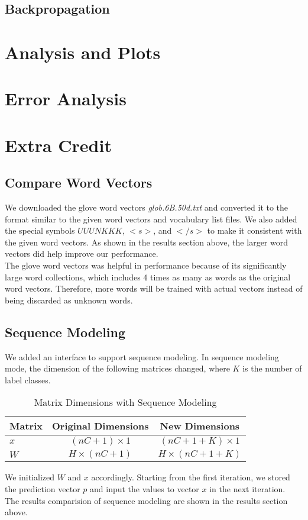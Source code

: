 \documentclass[12pt]{article}
\begin{document}
\subsection{Backpropagation}



\section{Analysis and Plots}



\section{Error Analysis}



\section{Extra Credit}

\subsection{Compare Word Vectors}
We downloaded the glove word vectors \textit{glob.6B.50d.txt} and converted it to the format similar to the given word vectors and vocabulary list files. We also added the special symbols $UUUNKKK$, $<s>$, and $</s>$ to make it consistent with the given word vectors. As shown in the results section above, the larger word vectors did help improve our performance.\\
The glove word vectors was helpful in performance because of its significantly large word collections, which includes 4 times as many as words as the original word vectors. Therefore, more words will be trained with actual vectors instead of being discarded as unknown words.

\subsection{Sequence Modeling}
We added an interface to support sequence modeling. In sequence modeling mode, the dimension of the following matrices changed, where $K$ is the number of label classes.

\begin{table}[H]
	\begin{center}
		\begin{tabular}{|l|c|c|}
			\hline
			Matrix & Original Dimensions & New Dimensions \\\hline
			$x$ & ${(nC+1)}\times{1}$ & ${(nC+1+K)}\times{1}$ \\\hline
			$W$ & ${H}\times{(nC+1)}$ & ${H}\times{(nC+1+K)}$ \\\hline
		\end{tabular}
	\end{center}
	\caption{Matrix Dimensions with Sequence Modeling}
	\label{tab:dim2}
\end{table}

We initialized $W$ and $x$ accordingly. Starting from the first iteration, we stored the prediction vector $p$ and input the values to vector $x$ in the next iteration.\\
The results comparision of sequence modeling are shown in the results section above.
\end{document}

